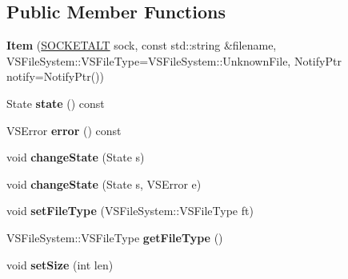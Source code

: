 \subsection*{Public Member Functions}
\begin{DoxyCompactItemize}
\item 
{\bfseries Item} (\hyperlink{classSOCKETALT}{S\+O\+C\+K\+E\+T\+A\+LT} sock, const std\+::string \&filename, V\+S\+File\+System\+::\+V\+S\+File\+Type=V\+S\+File\+System\+::\+Unknown\+File, Notify\+Ptr notify=Notify\+Ptr())\hypertarget{classVsnetDownload_1_1Client_1_1Item_a6c541aa3aac2fbbd6719846e01ad15a9}{}\label{classVsnetDownload_1_1Client_1_1Item_a6c541aa3aac2fbbd6719846e01ad15a9}

\item 
State {\bfseries state} () const \hypertarget{classVsnetDownload_1_1Client_1_1Item_aa30da1c6470728dba0c34acb8f19994b}{}\label{classVsnetDownload_1_1Client_1_1Item_aa30da1c6470728dba0c34acb8f19994b}

\item 
V\+S\+Error {\bfseries error} () const \hypertarget{classVsnetDownload_1_1Client_1_1Item_a10d84224e81d5b43a644eefb79800c52}{}\label{classVsnetDownload_1_1Client_1_1Item_a10d84224e81d5b43a644eefb79800c52}

\item 
void {\bfseries change\+State} (State s)\hypertarget{classVsnetDownload_1_1Client_1_1Item_a2f83372e22947169ef8bb67c01536489}{}\label{classVsnetDownload_1_1Client_1_1Item_a2f83372e22947169ef8bb67c01536489}

\item 
void {\bfseries change\+State} (State s, V\+S\+Error e)\hypertarget{classVsnetDownload_1_1Client_1_1Item_a63098106a6ac94471898e4319da9ece3}{}\label{classVsnetDownload_1_1Client_1_1Item_a63098106a6ac94471898e4319da9ece3}

\item 
void {\bfseries set\+File\+Type} (V\+S\+File\+System\+::\+V\+S\+File\+Type ft)\hypertarget{classVsnetDownload_1_1Client_1_1Item_a827ca12f702c9635fe6fe4778e8af4ec}{}\label{classVsnetDownload_1_1Client_1_1Item_a827ca12f702c9635fe6fe4778e8af4ec}

\item 
V\+S\+File\+System\+::\+V\+S\+File\+Type {\bfseries get\+File\+Type} ()\hypertarget{classVsnetDownload_1_1Client_1_1Item_a05a839c72a46afda1f31ced1987ad158}{}\label{classVsnetDownload_1_1Client_1_1Item_a05a839c72a46afda1f31ced1987ad158}

\item 
void {\bfseries set\+Size} (int len)\hypertarget{classVsnetDownload_1_1Client_1_1Item_a023c36a7628e52b456f91ad81314b71d}{}\label{classVsnetDownload_1_1Client_1_1Item_a023c36a7628e52b456f91ad81314b71d}


\end{DoxyCompactItemize}
